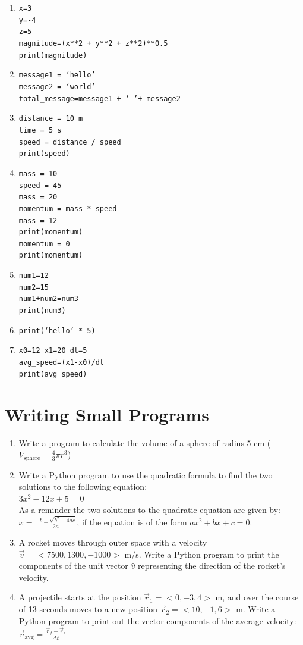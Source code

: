 \documentclass{article}
\begin{document}
\begin{enumerate}
	\item \texttt{x=3\\
	y=-4\\z=5\\magnitude=(x**2 + y**2 + z**2)**0.5\\print(magnitude)}
	\item \texttt{message1 = `hello'\\message2 = `world'\\total\_message=message1 + ` '+ message2}
	\item \texttt{distance = 10 m\\time = 5 s\\speed = distance / speed\\print(speed)}
	\item \texttt{mass = 10\\ speed = 45\\ mass = 20\\momentum = mass * speed\\mass = 12\\print(momentum)\\momentum = 0\\print(momentum)}
	\item \texttt{num1=12\\num2=15\\num1+num2=num3\\print(num3)}
	\item \texttt{print(`hello' * 5)}
	\item \texttt{x0=12 x1=20 dt=5\\avg\_speed=(x1-x0)/dt\\print(avg\_speed)}
\end{enumerate}

\section*{Writing Small Programs}
\begin{enumerate}
	\item Write a program to calculate the volume of a sphere of radius 5 cm ($V_\mathrm{sphere}=\frac{4}{3}\pi r^3$)
	\item Write a Python program to use the quadratic formula to find the two solutions to the following equation: \\$3x^2 -12x + 5 = 0$\\As a reminder the two solutions to the quadratic equation are given by: $x=\frac{-b\pm\sqrt{b^2-4ac}}{2a}$, if the equation is of the form $ax^2+bx+c=0$.
	\item A rocket moves through outer space with a velocity $\vec{v}=<7500,1300,-1000>$ m/s. Write a Python program to print the components of the unit vector $\hat{v}$ representing the direction of the rocket's velocity.
	\item A projectile starts at the position $\vec{r}_1=<0,-3,4>$ m, and over the course of 13 seconds moves to a new position $\vec{r}_2=<10,-1,6>$ m. Write a Python program to print out the vector components of the average velocity:\\ $\vec{v}_\mathrm{avg}=\frac{\vec{r}_f-\vec{r}_i}{\Delta t}$
\end{enumerate}
\end{document}
